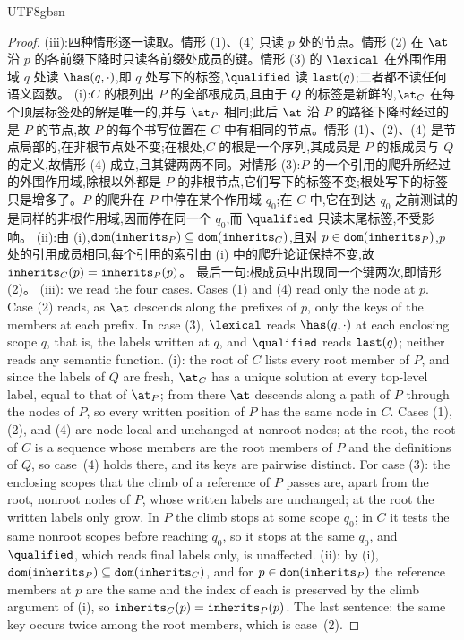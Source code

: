 \begin{CJK*}{UTF8}{gbsn}
\begin{proof}
\ifPaperChinese
(iii):四种情形逐一读取。情形 (1)、(4) 只读 $p$ 处的节点。情形 (2) 在 $\at$ 沿 $p$ 的各前缀下降时只读各前缀处成员的键。情形 (3) 的 $\lexical$ 在外围作用域 $q$ 处读 $\has(q, \cdot)$,即 $q$ 处写下的标签,$\qualified$ 读 $\mathtt{last}(q)$;二者都不读任何语义函数。
(i):$C$ 的根列出 $P$ 的全部根成员,且由于 $Q$ 的标签是新鲜的,$\at_C$ 在每个顶层标签处的解是唯一的,并与 $\at_P$ 相同;此后 $\at$ 沿 $P$ 的路径下降时经过的是 $P$ 的节点,故 $P$ 的每个书写位置在 $C$ 中有相同的节点。情形 (1)、(2)、(4) 是节点局部的,在非根节点处不变;在根处,$C$ 的根是一个序列,其成员是 $P$ 的根成员与 $Q$ 的定义,故情形 (4) 成立,且其键两两不同。对情形 (3):$P$ 的一个引用的爬升所经过的外围作用域,除根以外都是 $P$ 的非根节点,它们写下的标签不变;根处写下的标签只是增多了。$P$ 的爬升在 $P$ 中停在某个作用域 $q_0$;在 $C$ 中,它在到达 $q_0$ 之前测试的是同样的非根作用域,因而停在同一个 $q_0$,而 $\qualified$ 只读末尾标签,不受影响。
(ii):由 (i),$\mathtt{dom}(\mathtt{inherits}_P) \subseteq \mathtt{dom}(\mathtt{inherits}_C)$,且对 $p \in \mathtt{dom}(\mathtt{inherits}_P)$,$p$ 处的引用成员相同,每个引用的索引由 (i) 中的爬升论证保持不变,故 $\mathtt{inherits}_C(p) = \mathtt{inherits}_P(p)$。
最后一句:根成员中出现同一个键两次,即情形 (2)。
\else
(iii): we read the four cases. Cases (1) and (4) read only the node at $p$. Case (2) reads, as $\at$
descends along the prefixes of $p$, only the keys of the members at each prefix. In case (3),
$\lexical$ reads $\has(q, \cdot)$ at each enclosing scope $q$, that is, the labels written at $q$, and
$\qualified$ reads $\mathtt{last}(q)$; neither reads any semantic function.
(i): the root of $C$ lists every root member of $P$, and since the labels of $Q$ are fresh, $\at_C$ has
a unique solution at every top-level label, equal to that of $\at_P$; from there $\at$ descends along a
path of $P$ through the nodes of $P$, so every written position of $P$ has the same node in $C$. Cases
(1), (2), and (4) are node-local and unchanged at nonroot nodes; at the root, the root of $C$ is a
sequence whose members are the root members of $P$ and the definitions of $Q$, so case~(4) holds there,
and its keys are pairwise distinct. For
case (3): the enclosing scopes that the climb of a reference of $P$ passes are, apart from the root,
nonroot nodes of $P$, whose written labels are unchanged; at the root the written labels only grow. In
$P$ the climb stops at some scope $q_0$; in $C$ it tests the same nonroot scopes before reaching $q_0$,
so it stops at the same $q_0$, and $\qualified$, which reads final labels only, is unaffected.
(ii): by (i), $\mathtt{dom}(\mathtt{inherits}_P) \subseteq \mathtt{dom}(\mathtt{inherits}_C)$, and for $p \in \mathtt{dom}(\mathtt{inherits}_P)$ the
reference members at $p$ are the same and the index of each is preserved by the climb argument of (i),
so $\mathtt{inherits}_C(p) = \mathtt{inherits}_P(p)$.
The last sentence: the same key occurs twice among the root members, which is case~(2).
\fi
\end{proof}


\end{CJK*}
